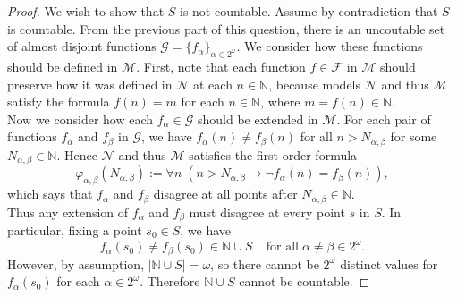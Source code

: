 \documentclass{article}
\begin{document}
\begin{enumerate}[label={\bf Q\arabic*:}]
\begin{enumerate}
\begin{proof}
          We wish to show that $S$ is not countable. Assume by
          contradiction that $S$ is countable. From the previous part of
          this question, there is an uncoutable set of almost disjoint
          functions $\mathcal{G}=\{f_{\alpha}\}_{\alpha\in2^\omega}$. We
          consider how these functions should be defined in $\mathcal{M}$.
          First, note that each function $f\in\mathcal{F}$ in $\mathcal{M}$
          should preserve how it was defined in $\mathcal{N}$ at each
          $n\in\mathbb{N}$, because models $\mathcal{N}$ and thus
          $\mathcal{M}$ satisfy the formula $f(n)=m$ for each
          $n\in\mathbb{N}$, where $m=f(n)\in\mathbb{N}$.  \\

          Now we consider how each $f_\alpha\in\mathcal{G}$ should be
          extended in $\mathcal{M}$. For each pair of functions $f_\alpha$
          and $f_\beta$ in $\mathcal{G}$, we have $f_\alpha(n)\neq
          f_\beta(n)$ for all $n>N_{\alpha,\beta}$ for some
          $N_{\alpha,\beta}\in\mathbb{N}$.  Hence $\mathcal{N}$ and thus
          $\mathcal{M}$ satisfies the first order formula
          \begin{equation*}
            \varphi_{\alpha,\beta}(N_{\alpha,\beta}) := \forall n\;
            (n>N_{\alpha,\beta}\rightarrow \neg f_\alpha(n)=f_\beta(n)),
          \end{equation*}
          which says that $f_\alpha$ and $f_\beta$ disagree at all points
          after $N_{\alpha,\beta}\in\mathbb{N}$. \\

          Thus any extension of $f_\alpha$ and $f_\beta$ must disagree at
          every point $s$ in $S$. In particular, fixing a point $s_0\in
          S$, we have
          \begin{equation*}
            f_\alpha(s_0)\neq f_\beta(s_0)\in\mathbb{N}\cup S\;\;\;\;
            \text{for all}\; \alpha\neq\beta\in2^\omega.
          \end{equation*}
          However, by assumption, $|\mathbb{N}\cup S|=\omega$, so there
          cannot be $2^\omega$ distinct values for $f_\alpha(s_0)$ for each
          $\alpha\in2^\omega$. Therefore $\mathbb{N}\cup S$ cannot be
          countable.
        \end{proof}
    \end{enumerate}
\end{enumerate}
\end{document}
